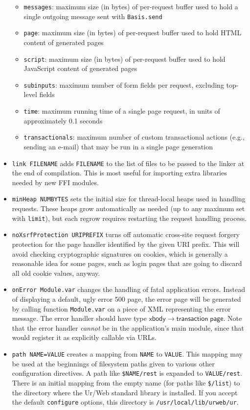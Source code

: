 \documentclass{article}
\newcommand{\mt}[1]{\mathsf{#1}}
\begin{document}
\begin{itemize}
\begin{itemize}
  \item \texttt{messages}: maximum size (in bytes) of per-request buffer used to hold a single outgoing message sent with \texttt{Basis.send}
  \item \texttt{page}: maximum size (in bytes) of per-request buffer used to hold HTML content of generated pages
  \item \texttt{script}: maximum size (in bytes) of per-request buffer used to hold JavaScript content of generated pages
  \item \texttt{subinputs}: maximum number of form fields per request, excluding top-level fields
  \item \texttt{time}: maximum running time of a single page request, in units of approximately 0.1 seconds
  \item \texttt{transactionals}: maximum number of custom transactional actions (e.g., sending an e-mail) that may be run in a single page generation
  \end{itemize}
\item \texttt{link FILENAME} adds \texttt{FILENAME} to the list of files to be passed to the linker at the end of compilation.  This is most useful for importing extra libraries needed by new FFI modules.
\item \texttt{minHeap NUMBYTES} sets the initial size for thread-local heaps used in handling requests.  These heaps grow automatically as needed (up to any maximum set with \texttt{limit}), but each regrow requires restarting the request handling process.
\item \texttt{noXsrfProtection URIPREFIX} turns off automatic cross-site request forgery protection for the page handler identified by the given URI prefix.  This will avoid checking cryptographic signatures on cookies, which is generally a reasonable idea for some pages, such as login pages that are going to discard all old cookie values, anyway.
\item \texttt{onError Module.var} changes the handling of fatal application errors.  Instead of displaying a default, ugly error 500 page, the error page will be generated by calling function \texttt{Module.var} on a piece of XML representing the error message.  The error handler should have type $\mt{xbody} \to \mt{transaction} \; \mt{page}$.  Note that the error handler \emph{cannot} be in the application's main module, since that would register it as explicitly callable via URLs.
\item \texttt{path NAME=VALUE} creates a mapping from \texttt{NAME} to \texttt{VALUE}.  This mapping may be used at the beginnings of filesystem paths given to various other configuration directives.  A path like \texttt{\$NAME/rest} is expanded to \texttt{VALUE/rest}.  There is an initial mapping from the empty name (for paths like \texttt{\$/list}) to the directory where the Ur/Web standard library is installed.  If you accept the default \texttt{configure} options, this directory is \texttt{/usr/local/lib/urweb/ur}.

\end{itemize}
\end{document}
